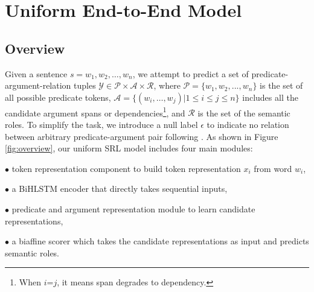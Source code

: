 \documentclass[letterpaper]{article} %
\begin{document}





\section{Uniform End-to-End Model}




\subsection{Overview}

Given a sentence $s=w_1, w_2, \dots, w_n$, we attempt to predict a set of predicate-argument-relation tuples $\mathcal{Y} \in \mathcal{P} \times \mathcal{A} \times \mathcal{R}$, where $\mathcal{P} = \{w_1, w_2, ..., w_n\}$ is the set of all possible predicate tokens, $\mathcal{A} = \{(w_i,\dots,w_j) | 1 \leq i \leq j \leq n \}$ includes all the candidate argument spans or dependencies\footnote{When $i$=$j$, it means span degrades to dependency.}, and $\mathcal{R}$ is the set of the semantic roles. To simplify the task, we introduce a null label $\epsilon$ to indicate no relation between arbitrary predicate-argument pair following \citeauthor{he2018jointly} . As shown in Figure \ref{fig:overview}, our uniform SRL model includes four main modules: 

$\bullet$ token representation component to build token representation $x_i$ from word $w_i$,

$\bullet$ a BiHLSTM encoder that directly takes sequential inputs,

$\bullet$ predicate and argument representation module to learn candidate representations,

$\bullet$ a biaffine scorer which takes the candidate representations as input and predicts semantic roles.

\end{document}
